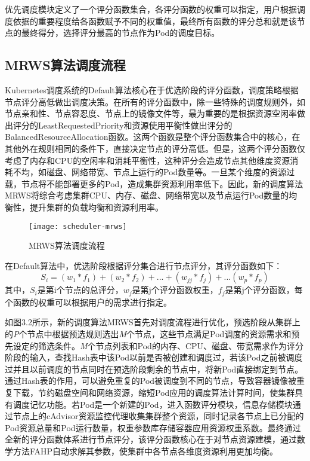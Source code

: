 优先调度模块定义了一个评分函数集合，各评分函数的权重可以指定，用户根据调度依据的重要程度给各函数赋予不同的权重值，最终所有函数的评分总和就是该节点的最终得分，选择评分最高的节点作为Pod的调度目标。

\subsection{MRWS算法调度流程}
Kubernetes调度系统的Default算法核心在于优选阶段的评分函数，调度策略根据节点评分高低做出调度决策。在所有的评分函数中，除一些特殊的调度规则外，如节点亲和性、节点容忍度、节点上的镜像文件等，最为重要的是根据资源空闲率做出评分的LeastRequestedPriority和资源使用平衡性做出评分的BalancedResourceAllocation函数。这两个函数是整个评分函数集合中的核心，在其他外在规则相同的条件下，直接决定节点的评分高低。但是，这两个评分函数仅考虑了内存和CPU的空闲率和消耗平衡性，这种评分会造成节点其他维度资源消耗不均，如磁盘、网络带宽、节点上运行的Pod数量等。一旦某个维度的资源过载，节点将不能部署更多的Pod，造成集群资源利用率低下。因此，新的调度算法MRWS将综合考虑集群CPU、内存、磁盘、网络带宽以及节点运行Pod数量的均衡性，提升集群的负载均衡和资源利用率。
\begin{figure}[H] %
	\centering
	\texttt{[image: scheduler-mrws]}
	\caption{MRWS算法调度流程}
\end{figure}
在Default算法中，优选阶段根据评分集合进行节点评分，其评分函数如下：
\begin{equation}
	S_{i} = (w_{1}*f_{1})+(w_{2}*f_{2})+...+(w_{jj}*f_{j})+...(w_{p}*f_{p})
\end{equation}
其中，\begin{math}S_{i}\end{math}是第i个节点的总评分，\begin{math}w_{j}\end{math}是第j个评分函数权重，\begin{math}f_{j}\end{math}是第j个评分函数，每个函数的权重可以根据用户的需求进行指定。

如图3.2所示，新的调度算法MRWS首先对调度流程进行优化，预选阶段从集群上的\emph{P}个节点中根据预选规则选出\emph{M}个节点，这些节点满足Pod调度的资源需求和预先设定的筛选条件。\emph{M}个节点列表和Pod的内存、CPU、磁盘、带宽需求作为评分阶段的输入，查找Hash表中该Pod以前是否被创建和调度过，若该Pod之前被调度过并且以前调度的节点同时在预选阶段剩余的节点中，将新Pod直接绑定到节点。通过Hash表的作用，可以避免重复的Pod被调度到不同的节点，导致容器镜像被重复下载，节约磁盘空间和网络资源，缩短Pod应用的调度算法计算时间，使集群具有调度记忆功能。若Pod是一个新建的Pod，进入函数评分模块，信息存储模块通过节点上的cAdvisor资源监控代理收集集群整个资源，同时记录各节点上已分配的Pod资源总量和Pod运行数量，权重参数库存储容器应用资源权重系数。最终通过全新的评分函数体系进行节点评分，该评分函数核心在于对节点资源建模，通过数学方法FAHP自动求解其参数，使集群中各节点各维度资源利用更加均衡。


